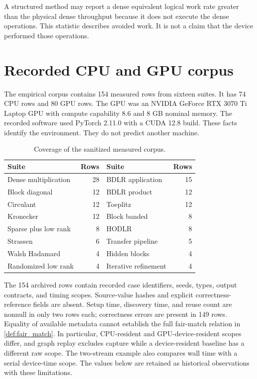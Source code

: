 \begin{remark}\label{main:remark:005}\label{rem:logical_gflops}
A structured method may report a dense equivalent logical work rate greater than the physical dense throughput because it does not execute the dense operations. This statistic describes avoided work. It is not a claim that the device performed those operations.
\end{remark}

\section{Recorded CPU and GPU corpus}\label{main:section:012}\label{sec:measured}

The empirical corpus contains 154 measured rows from sixteen suites. It has 74 CPU rows and 80 GPU rows. The GPU was an NVIDIA GeForce RTX 3070 Ti Laptop GPU with compute capability 8.6 and 8 GB nominal memory. The recorded software used PyTorch 2.11.0 with a CUDA 12.8 build. These facts identify the environment. They do not predict another machine.

\begin{table}[t]
\centering
\small
\begin{tabular}{>{\raggedright\arraybackslash}p{}r>{\raggedright\arraybackslash}p{}r}
\toprule
Suite & Rows & Suite & Rows \\
\midrule
Dense multiplication & 28 & BDLR application & 15 \\
Block diagonal & 12 & BDLR product & 12 \\
Circulant & 12 & Toeplitz & 12 \\
Kronecker & 12 & Block banded & 8 \\
Sparse plus low rank & 8 & HODLR & 8 \\
Strassen & 6 & Transfer pipeline & 5 \\
Walsh Hadamard & 4 & Hidden blocks & 4 \\
Randomized low rank & 4 & Iterative refinement & 4 \\
\bottomrule
\end{tabular}
\caption{Coverage of the sanitized measured corpus.}
\label{tab:suites}
\end{table}

The 154 archived rows contain recorded case identifiers, seeds, types, output contracts, and timing scopes. Source-value hashes and explicit correctness-reference fields are absent. Setup time, discovery time, and reuse count are nonnull in only two rows each; correctness errors are present in 149 rows. Equality of available metadata cannot establish the full fair-match relation in \cref{def:fair_match}. In particular, CPU-resident and GPU-device-resident scopes differ, and graph replay excludes capture while a device-resident baseline has a different raw scope. The two-stream example also compares wall time with a serial device-time scope. The values below are retained as historical observations with these limitations.

